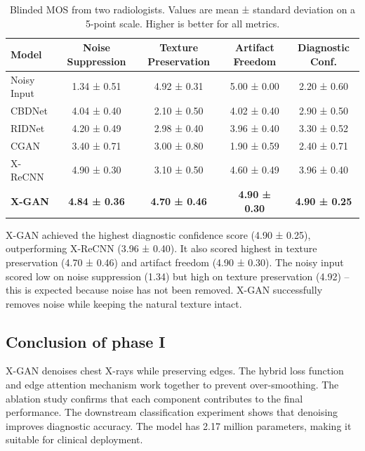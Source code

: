 \begin{table}[H]
	\centering
	\small
	\caption{Blinded MOS from two radiologists. Values are mean ± standard deviation on a 5-point scale. Higher is better for all metrics.}
	\label{tab:xgan_mos}
	\begin{tabular}{lcccc}
		\toprule
		Model & Noise Suppression & Texture Preservation & Artifact Freedom & Diagnostic Conf. \\
		\midrule
		Noisy Input & 1.34 ± 0.51 & 4.92 ± 0.31 & 5.00 ± 0.00 & 2.20 ± 0.60 \\
		CBDNet & 4.04 ± 0.40 & 2.10 ± 0.50 & 4.02 ± 0.40 & 2.90 ± 0.50 \\
		RIDNet & 4.20 ± 0.49 & 2.98 ± 0.40 & 3.96 ± 0.40 & 3.30 ± 0.52 \\
		CGAN & 3.40 ± 0.71 & 3.00 ± 0.80 & 1.90 ± 0.59 & 2.40 ± 0.71 \\
		X-ReCNN & 4.90 ± 0.30 & 3.10 ± 0.50 & 4.60 ± 0.49 & 3.96 ± 0.40 \\
		\textbf{X-GAN} & \textbf{4.84 ± 0.36} & \textbf{4.70 ± 0.46} & \textbf{4.90 ± 0.30} & \textbf{4.90 ± 0.25} \\
		\bottomrule
	\end{tabular}
\end{table}

X-GAN achieved the highest diagnostic confidence score (4.90 ± 0.25), outperforming X-ReCNN (3.96 ± 0.40). It also scored highest in texture preservation (4.70 ± 0.46) and artifact freedom (4.90 ± 0.30). The noisy input scored low on noise suppression (1.34) but high on texture preservation (4.92) – this is expected because noise has not been removed. X-GAN successfully removes noise while keeping the natural texture intact.

\subsection{Conclusion of phase I}

X-GAN denoises chest X-rays while preserving edges. The hybrid loss function and edge attention mechanism work together to prevent over-smoothing. The ablation study confirms that each component contributes to the final performance. The downstream classification experiment shows that denoising improves diagnostic accuracy. The model has 2.17 million parameters, making it suitable for clinical deployment.
